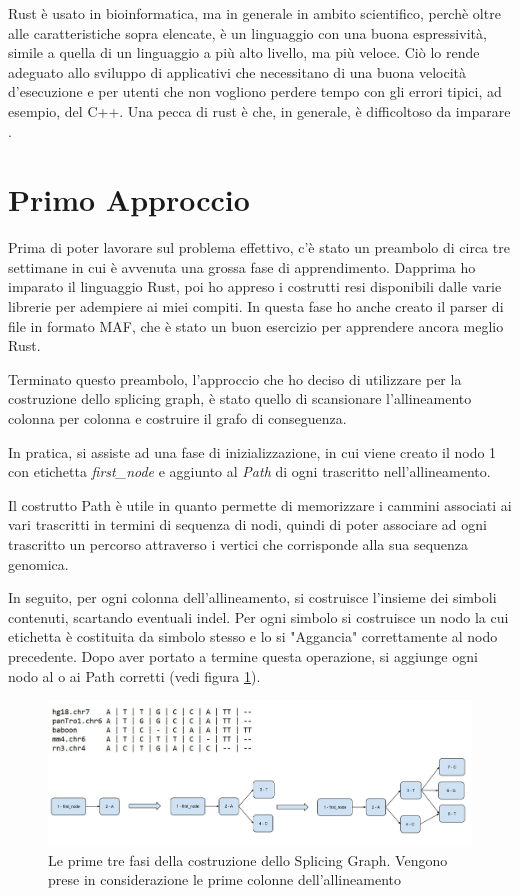 Rust è usato in bioinformatica, ma in generale in ambito scientifico, perchè oltre alle caratteristiche sopra elencate, è un linguaggio con una buona espressività, simile a quella di un linguaggio a più alto livello, ma più veloce. Ciò lo rende adeguato allo sviluppo di applicativi che necessitano di una buona velocità d'esecuzione e per utenti che non vogliono perdere tempo con gli errori tipici, ad esempio, del C++. Una pecca di rust è che, in generale, è difficoltoso da imparare \cite{whyrust}. 

\section{Primo Approccio}
Prima di poter lavorare sul problema effettivo, c'è stato un preambolo di circa tre settimane in cui è avvenuta una grossa fase di apprendimento. Dapprima ho imparato il linguaggio Rust, poi ho appreso i costrutti resi disponibili dalle varie librerie per adempiere ai miei compiti. In questa fase ho anche creato il parser di file in formato MAF, che è stato un buon esercizio per apprendere ancora meglio Rust.

Terminato questo preambolo, l'approccio che ho deciso di utilizzare per la costruzione dello splicing graph, è stato quello di scansionare l'allineamento colonna per colonna e costruire il grafo di conseguenza. 

In pratica, si assiste ad una fase di inizializzazione, in cui viene creato il nodo 1 con etichetta \textit{first\_node} e aggiunto al \textit{Path} di ogni trascritto nell'allineamento. 

Il costrutto Path è utile in quanto permette di memorizzare i cammini associati ai vari trascritti in termini di sequenza di nodi, quindi di poter associare ad ogni trascritto un percorso attraverso i vertici che corrisponde alla sua sequenza genomica.

In seguito, per ogni colonna dell'allineamento, si costruisce l'insieme dei simboli contenuti, scartando eventuali indel. Per ogni simbolo si costruisce un nodo la cui etichetta è costituita da simbolo stesso e lo si "Aggancia" correttamente al nodo precedente. Dopo aver portato a termine questa operazione, si aggiunge ogni nodo al o ai Path corretti (vedi figura \ref{fig:SplicingGraphConstructionPhases}).

\begin{figure}
    \centering
    \includegraphics[scale=0.43]{images/Fasi primo approccio.PNG}
    \caption{Le prime tre fasi della costruzione dello Splicing Graph. Vengono prese in considerazione le prime colonne dell'allineamento}
    \label{fig:SplicingGraphConstructionPhases}
\end{figure}

